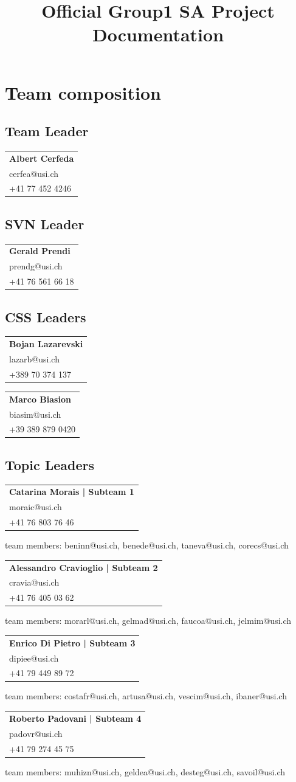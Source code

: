 \documentclass[a4paper,10pt]{article}
\title{Official Group1 SA Project Documentation}
\date{}
\newcommand{\idcard}[3]{
    \vspace{-0.3cm}
    \begin{table}[h!]
     \begin{tabular}{|l|}
        \hline
        \textbf{#1} \\
        #2 \\
        #3\\
        \hline
     \end{tabular}
    \end{table}
    \vspace{-0.3cm}
}
\begin{document}
\maketitle
\tableofcontents
\newpage

\section{Team composition}

    \subsection{Team Leader}
        \idcard{Albert Cerfeda}{cerfea@usi.ch}{+41 77 452 4246}
    \subsection{SVN Leader}
        \idcard{Gerald Prendi}{prendg@usi.ch}{+41 76 561 66 18}
        
    \subsection{CSS Leaders}
        \idcard{Bojan Lazarevski}{lazarb@usi.ch}{+389 70 374 137}
        \idcard{Marco Biasion}{biasim@usi.ch}{+39 389 879 0420}
        
    \subsection{Topic Leaders}
        \label{topicleaders}
        \idcard{Catarina Morais | \textbf{Subteam 1}}{moraic@usi.ch}{+41 76 803 76 46}
        team members: beninn@usi.ch, benede@usi.ch, taneva@usi.ch, corecs@usi.ch\newline
        
        \idcard{Alessandro Cravioglio | \textbf{Subteam 2}}{cravia@usi.ch}{+41 76 405 03 62}
        team members: morarl@usi.ch, gelmad@usi.ch, faucoa@usi.ch, jelmim@usi.ch\newline 
        
        \idcard{Enrico Di Pietro | \textbf{Subteam 3}}{dipiee@usi.ch}{+41 79 449 89 72}
        team members: costafr@usi.ch, artusa@usi.ch, vescim@usi.ch, ibaner@usi.ch\newline
        
        \idcard{Roberto Padovani | \textbf{Subteam 4}}{padovr@usi.ch}{+41 79 274 45 75}
        team members: muhizn@usi.ch, geldea@usi.ch, desteg@usi.ch, savoil@usi.ch\newline
        
\end{document}
